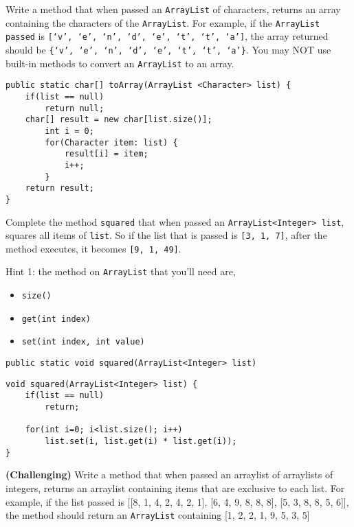 \begin{questions}
\question Write a method that when passed an \texttt{ArrayList} of characters, returns an array containing the characters of the \texttt{ArrayList}. For example, if the \texttt{ArrayList passed} is \texttt{[`v', `e', `n', `d', `e', `t', `t', `a']}, the array returned should be \texttt{\{`v', `e', `n', `d', `e', `t', `t', `a'\}}. You may NOT use built-in methods to convert an \texttt{ArrayList} to an array.

\begin{solution}
\begin{lstlisting}
public static char[] toArray(ArrayList <Character> list) {
	if(list == null) 
		return null;
	char[] result = new char[list.size()];
		int i = 0;
		for(Character item: list) {
			result[i] = item;
			i++;
		}
	return result;
}	
\end{lstlisting}	
\end{solution}


\question Complete the method \texttt{squared} that when passed an \texttt{ArrayList<Integer> list}, squares all items of \texttt{list}. So if the list that is passed is \texttt{[3, 1, 7]}, after the method executes, it becomes \texttt{[9, 1, 49]}.

Hint 1: the method on \texttt{ArrayList} that you'll need are,

\begin{itemize}
\item \texttt{size()}
\item\texttt{get(int index)}
\item \texttt{set(int index, int value)}
\end{itemize}

\begin{lstlisting}
public static void squared(ArrayList<Integer> list)
\end{lstlisting}

\begin{solution}
\begin{lstlisting}
void squared(ArrayList<Integer> list) {
	if(list == null)
		return;

	for(int i=0; i<list.size(); i++)
		list.set(i, list.get(i) * list.get(i));
}
\end{lstlisting}
\end{solution}

\question \textbf{(Challenging)} Write a method that when passed an arraylist of arraylists of integers, returns an arraylist containing items that are exclusive to each list. For example, if the list passed is [[8, 1, 4, 2, 4, 2, 1], [6, 4, 9, 8, 8, 8], [5, 3, 8, 8, 5, 6]], the method should return an \texttt{ArrayList} containing [1, 2, 2, 1, 9, 5, 3, 5]


\end{questions}
